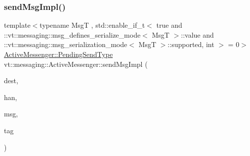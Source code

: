 \subsubsection{\texorpdfstring{send\+Msg\+Impl()}{sendMsgImpl()}\hspace{0.1cm}{\footnotesize\ttfamily [3/4]}}
{\footnotesize\ttfamily template$<$typename MsgT , std\+::enable\+\_\+if\+\_\+t$<$ true and \+::vt\+::messaging\+::msg\+\_\+defines\+\_\+serialize\+\_\+mode$<$ Msg\+T $>$\+::value and \+::vt\+::messaging\+::msg\+\_\+serialization\+\_\+mode$<$ Msg\+T $>$\+::supported, int $>$  = 0$>$ \\
\hyperlink{structvt_1_1messaging_1_1_active_messenger_a3626a6ca76d8ad4ec7c3b47a2c70d3a8}{Active\+Messenger\+::\+Pending\+Send\+Type} vt\+::messaging\+::\+Active\+Messenger\+::send\+Msg\+Impl (\begin{DoxyParamCaption}\item[{\hyperlink{namespacevt_a866da9d0efc19c0a1ce79e9e492f47e2}{Node\+Type}}]{dest,  }\item[{\hyperlink{namespacevt_af64846b57dfcaf104da3ef6967917573}{Handler\+Type}}]{han,  }\item[{\hyperlink{structvt_1_1messaging_1_1_msg_shared_ptr}{Msg\+Shared\+Ptr}$<$ MsgT $>$ \&}]{msg,  }\item[{\hyperlink{namespacevt_a84ab281dae04a52a4b243d6bf62d0e52}{Tag\+Type}}]{tag }\end{DoxyParamCaption})\hspace{0.3cm}{\ttfamily [inline]}}

\mbox{\label{structvt_1_1messaging_1_1_active_messenger_aae60feeb3e184a5a77d9be6e7c43d91a}} 
